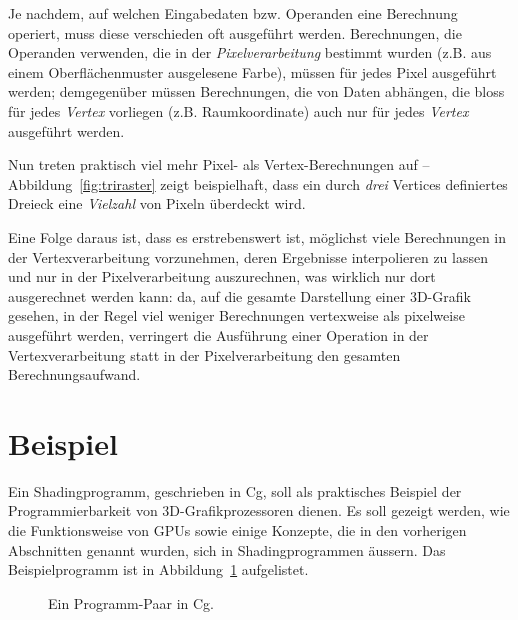 \documentclass[twoside,a4paper,fleqn,12pt]{book}
\begin{document}
Je nachdem, auf welchen Eingabedaten bzw. Operanden eine Berechnung operiert, muss diese verschieden oft ausgeführt werden.
Berechnungen, die Operanden verwenden, die in der \emph{Pixelverarbeitung} bestimmt wurden (z.B. aus einem Oberflächenmuster ausgelesene Farbe),
müssen für jedes Pixel ausgeführt werden;
demgegenüber müssen Berechnungen, die von Daten abhängen, die bloss für jedes \emph{Vertex} vorliegen (z.B. Raumkoordinate)
auch nur für jedes \emph{Vertex} ausgeführt werden.

Nun treten praktisch viel mehr Pixel- als Vertex-Berechnungen auf -- Abbildung~\ref{fig:triraster} zeigt beispielhaft,
dass ein durch \emph{drei} Vertices definiertes Dreieck eine \emph{Vielzahl} von Pixeln überdeckt wird.

Eine Folge daraus ist, dass es erstrebenswert ist, möglichst viele Berechnungen in der Vertexverarbeitung vorzunehmen, deren Ergebnisse interpolieren zu lassen
und nur in der Pixelverarbeitung auszurechnen, was wirklich nur dort ausgerechnet werden kann: da, auf die gesamte Darstellung einer 3D-Grafik gesehen,
in der Regel viel weniger Berechnungen vertexweise als pixelweise ausgeführt werden, verringert die Ausführung einer Operation in der Vertexverarbeitung statt in der Pixelverarbeitung
den gesamten Berechnungsaufwand.

\section{Beispiel}


Ein Shadingprogramm, geschrieben in Cg, soll als praktisches Beispiel der Programmierbarkeit von 3D-Grafikprozessoren dienen.
Es soll gezeigt werden, wie die Funktionsweise von GPUs sowie einige Konzepte, die in den vorherigen
Abschnitten genannt wurden, sich in Shadingprogrammen äussern. Das Beispielprogramm ist in Abbildung~\ref{fig:simple_cg} aufgelistet.

\begin{figure}[hp]
  
  \caption{Ein Programm-Paar in Cg.}
  \label{fig:simple_cg}
\end{figure}
\end{document}
